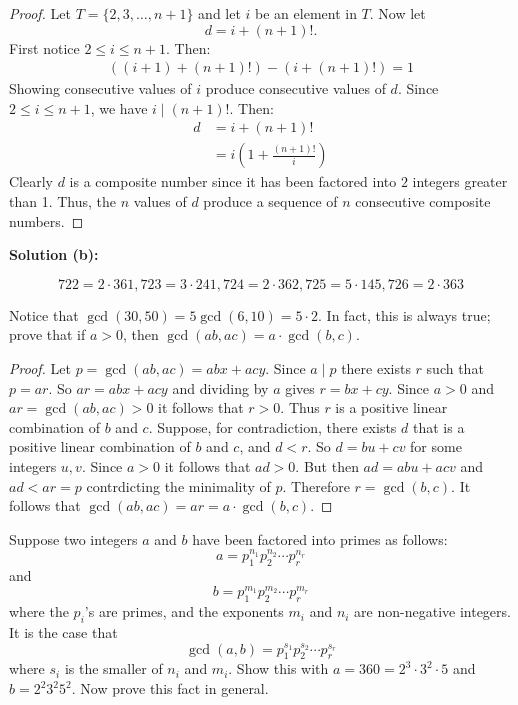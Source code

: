 \documentclass[8pt]{article}
\begin{document}
\begin{proof}
    Let $T = \{2, 3, \ldots, n + 1\}$ and let $i$ be an element in $T$.
    Now let 
    \[
        d = i + (n+1)!.
    \]
    First notice $2 \le i \le n + 1$. Then:
    \begin{align*}
        ((i + 1) + (n+1)!) - (i + (n+1)!) = 1
    \end{align*}
    Showing consecutive values of $i$ produce consecutive values of $d$. 
    Since $2 \le i \le n+1$, we have $i \mid (n+1)!$.
    Then:
    \begin{align*}
        d &= i + (n+1)! \\
          &= i \left( 1 + \frac{(n+1)!}{i} \right)
    \end{align*}
    Clearly $d$ is a composite number since it has been factored into $2$ integers greater than 1.
    Thus, the $n$ values of $d$ produce a sequence of $n$ consecutive composite numbers.
\end{proof}

\textbf{Solution (b):}

\[722 = 2 \cdot 361, 723 = 3 \cdot 241, 724 = 2 \cdot 362, 725 = 5 \cdot 145, 726 = 2 \cdot 363\]

\begin{tcolorbox}[title=Problem 9, breakable]
    Notice that $\gcd(30, 50) = 5\gcd(6, 10) = 5 \cdot 2$. In fact, this is 
    always true; prove that if $a > 0$, then $\gcd(ab, ac) = a \cdot \gcd(b, c)$.
\end{tcolorbox}

\begin{proof}
    Let $p = \gcd(ab, ac) = abx + acy$. Since $a \mid p$ there exists $r$ such that $p = ar$.
    So $ar = abx + acy$ and dividing by $a$ gives $r = bx + cy$. 
    Since $a > 0$
        and $ar = \gcd (ab,ac) > 0$ it follows that $r > 0$. 
    Thus $r$ is a positive linear combination of $b$ and $c$.
    Suppose, for contradiction, there exists $d$ that is a positive linear combination of $b$ and $c$, and $d < r$.
    So $d = bu + cv$ for some integers $u, v$.
    Since $a > 0$ it follows that $ad > 0$.
    But then $ad = abu + acv$ and $ad < ar = p$ contrdicting the minimality of $p$.
    Therefore $r = \gcd(b, c)$.
    It follows that $\gcd(ab, ac) = ar =  a \cdot \gcd(b, c)$.
\end{proof}

\begin{tcolorbox}[title=Problem 10, breakable]
    Suppose two integers $a$ and $b$ have been factored into primes as follows:
    \[a = p_1^{n_1} p_2^{n_2} \cdots p_r^{n_r}\]
    and 
     \[b = p_1^{m_1} p_2^{m_2} \cdots p_r^{m_r}\]
    where the $p_i$'s are primes, and the exponents $m_i$ and $n_i$ are non-negative 
    integers. It is the case that 
    \[\gcd(a, b) = p_1^{s_1} p_2^{s_2} \cdots p_r^{s_r}\]
    where $s_i$ is the smaller of $n_i$ and $m_i$. Show this with $a = 360 = 2^3 \cdot 3^2 \cdot 5$
    and $b = 2^2 3^2 5^2$. Now prove this fact in general.
\end{tcolorbox}
\end{document}
